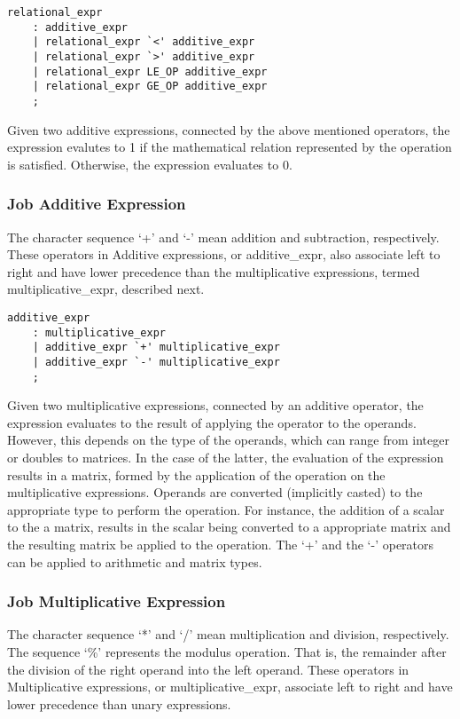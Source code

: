 \documentclass[prodmode,acmtecs]{acmsmall}
\begin{document}
\begin{lstlisting}
relational_expr
	: additive_expr
	| relational_expr `<' additive_expr
	| relational_expr `>' additive_expr
	| relational_expr LE_OP additive_expr
	| relational_expr GE_OP additive_expr
	;
\end{lstlisting}

Given two additive expressions, connected by the above mentioned operators, 
the expression evalutes to 1 if the mathematical relation represented by 
the operation is satisfied. Otherwise, the expression evaluates to 0. 

\subsubsection{Job Additive Expression}

The character sequence `+' and `-' mean addition and subtraction, 
respectively. These operators in Additive expressions, or additive\_expr, 
also associate left to right and have lower precedence than the 
multiplicative expressions, termed multiplicative\_expr, described next.

\begin{lstlisting}
additive_expr
	: multiplicative_expr
	| additive_expr `+' multiplicative_expr
	| additive_expr `-' multiplicative_expr
	;
\end{lstlisting}

Given two multiplicative expressions, connected by an additive operator, 
the expression evaluates to the result of applying the operator to the
operands. However, this depends on the type of the operands, which can
range from integer or doubles to matrices. In the case of the latter,
the evaluation of the expression results in a matrix, formed by the 
application of the operation on the multiplicative expressions. Operands 
are converted (implicitly casted) to the appropriate type to perform the
operation. For instance, the addition of a scalar to the a matrix, results in 
the scalar being converted to a appropriate matrix and the resulting matrix
be applied to the operation. The `+' and the `-' operators can be applied 
to arithmetic and matrix types.

\subsubsection{Job Multiplicative Expression}

The character sequence `*' and `/' mean multiplication and division, 
respectively. The sequence `\%' represents the modulus operation. That
is, the remainder after the division of the right operand into the left
operand. These operators in Multiplicative expressions, or 
multiplicative\_expr, associate left to right and have lower precedence 
than unary expressions.
\end{document}
